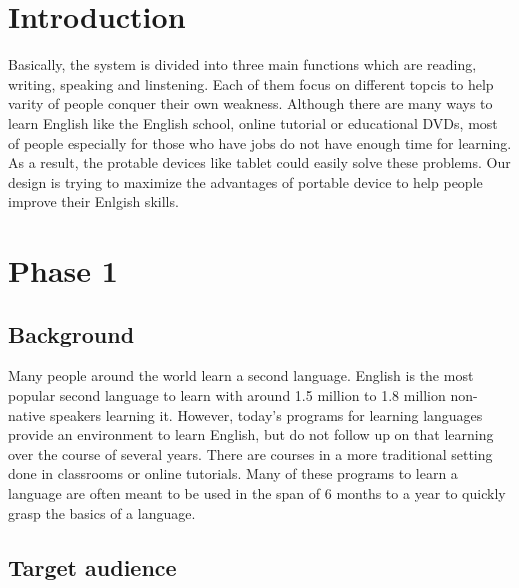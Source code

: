 \documentclass{sigchi}
\begin{document}


\section{Introduction}

Basically, the system is divided into  three main functions which are reading, 
writing, speaking and linstening. Each of them  focus on different topcis to help
varity of people conquer their own weakness. Although there are many ways to 
learn English like the English school, online tutorial or educational DVDs, 
most of people especially for those who have jobs do not have enough time for 
learning. As a result, the protable devices like tablet could easily solve 
these problems. Our design is trying to maximize the advantages of portable 
device to help people improve their Enlgish skills.

\section{Phase 1}

\subsection{Background}

Many people around the world learn a second language. English is the most 
popular second language to learn with around 1.5 million to 1.8 million 
non-native speakers learning it. However, today’s programs for learning 
languages provide an environment to learn English, but do not follow up on that 
learning over the course of several years. There are courses in a more 
traditional setting done in classrooms or online tutorials. Many of these 
programs to learn a language are often meant to be used in the span of 6 months 
to a year to quickly grasp the basics of a language.

\subsection{Target audience}
\end{document}

